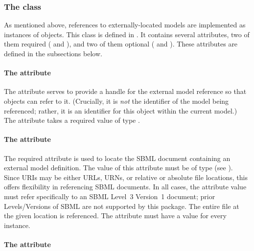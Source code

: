 \subsubsection{The  class}
\label{externalmodeldefinition-class}

As mentioned above, references to externally-located models are
implemented as instances of \ExternalModelDefinition objects.  This
class is defined in .  It contains several
attributes, two of them required ( and ), and
two of them optional ( and ).  These
attributes are defined in the subsections below.


\paragraph{The \hspace*{1pt} attribute}

The  attribute serves to provide a handle for the external
model reference so that \Submodel objects can refer to it.  (Crucially,
it is \emph{not} the identifier of the model being referenced; rather,
it is an identifier for this \ExternalModelDefinition object within the
current model.)  The  attribute takes a required value of type
.


\paragraph{The \hspace*{1pt} attribute}

The required attribute  is used to locate the SBML
document containing an external model definition.  The value of this
attribute must be of type  (see ).
Since URIs may be either URLs, URNs, or relative or absolute file
locations, this offers flexibility in referencing SBML documents.  In
all cases, the  attribute value must refer specifically to
an SBML Level~3 Version~1 document; prior Levels/Versions of SBML are
not supported by this package.  The entire file at the given location is
referenced.  The  attribute must have a value for every
\ExternalModelDefinition instance.


\paragraph{The \hspace*{1pt} attribute}


